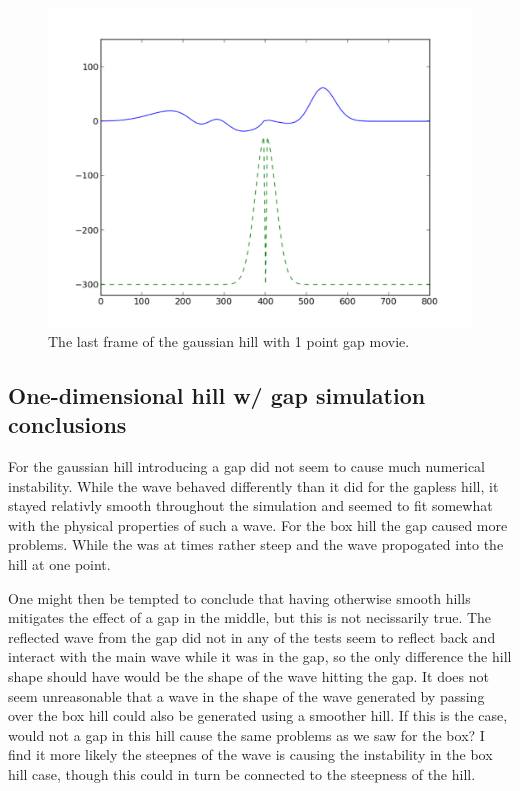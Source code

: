 \documentclass[twoside]{article}
\begin{document}
\begin{figure} 
  \centering
  \includegraphics[scale=0.4]{PdfImages/1d_gaussian_slit1_280.pdf}
  \caption{The last frame of the gaussian hill with 1 point gap movie.} \label{fig:box_1d_narrow}
\end{figure}

\subsection{One-dimensional hill w/ gap simulation conclusions}
For the gaussian hill introducing a gap did not seem to cause much numerical instability. While the wave behaved differently than it did for the gapless hill, it stayed relativly smooth throughout the simulation and seemed to fit somewhat with the physical properties of such a wave. For the box hill the gap caused more problems. While the was at times rather steep and the wave propogated into the hill at one point.

One might then be tempted to conclude that having otherwise smooth hills mitigates the effect of a gap in the middle, but this is not necissarily true. The reflected wave from the gap did not in any of the tests seem to reflect back and interact with the main wave while it was in the gap, so the only difference the hill shape should have would be the shape of the wave hitting the gap. It does not seem unreasonable that a wave in the shape of the wave generated by passing over the box hill could also be generated using a smoother hill. If this is the case, would not a gap in this hill cause the same problems as we saw for the box? I find it more likely the steepnes of the wave is causing the instability in the box hill case, though this could in turn be connected to the steepness of the hill.
\end{document}
